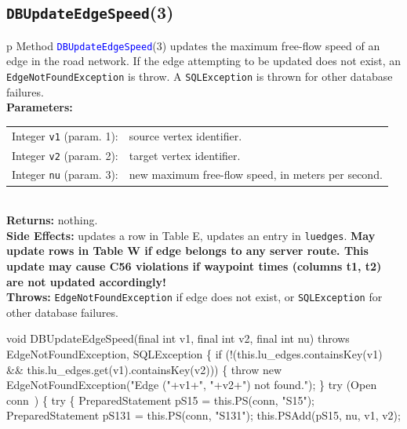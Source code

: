 \subsection{\texttt{DBUpdateEdgeSpeed}(3)}
\begin{tabular}{p{\textwidth}}
\toprule
{}
Method \textcolor{blue}{{\tt{}\protect{}DBUpdateEdgeSpeed}}(3) updates the maximum free-flow
speed of an edge in the road network. If the edge attempting to be updated
does not exist, an {\tt{}EdgeNotFoundException} is throw.
A {\tt{}SQLException} is thrown for other database failures.\\
\midrule
\textbf{Parameters:} \\
\begin{tabular}{lp{116mm}}
Integer {\tt{}v1} (param. 1):&source vertex identifier.\\
Integer {\tt{}v2} (param. 2):&target vertex identifier.\\
Integer {\tt{}nu} (param. 3):&new maximum free-flow speed, in meters per second.
\end{tabular}\\
\textbf{Returns:} nothing.\\
\textbf{Side Effects:} updates a row in Table E, updates an entry in
{\tt{}lu{}edges}. \textbf{May update rows in Table W if edge belongs to
any server route. This update may cause C56 violations if waypoint times
(columns \textsf{t1}, \textsf{t2}) are not updated accordingly!}\\
\textbf{Throws:} {\tt{}EdgeNotFoundException} if edge does not exist,
or {\tt{}SQLException} for other database failures.\\
\bottomrule
\end{tabular}
\nwenddocs{}\endmoddef{}
void DBUpdateEdgeSpeed(final int v1, final int v2, final int nu)
throws EdgeNotFoundException, SQLException \{
  if (!(this.lu_edges.containsKey(v1) && this.lu_edges.get(v1).containsKey(v2))) \{
    throw new EdgeNotFoundException("Edge ("+v1+", "+v2+") not found.");
  \}
  try (\LA{}Open \code{}conn\edoc{}~{\nwtagstyle{}}\RA{}) \{
    try \{
      PreparedStatement pS15 = this.PS(conn, "S15");
      PreparedStatement pS131 = this.PS(conn, "S131");
      this.PSAdd(pS15, nu, v1, v2);
